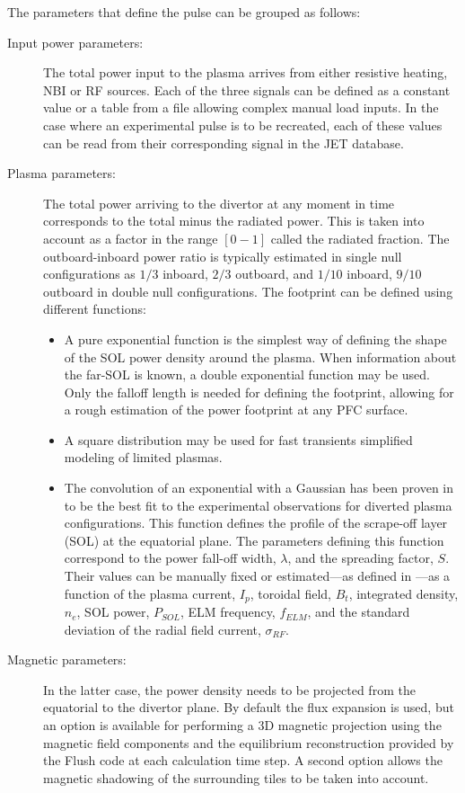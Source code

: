 The parameters that define the pulse can be grouped as follows:
\begin{description}
	\item [Input power parameters:] The total power input to the plasma arrives from either resistive heating, NBI or RF sources. Each of the three signals can be defined as a constant value or a table from a file allowing complex manual load inputs. In the case where an experimental pulse is to be recreated, each of these values can be read from their corresponding signal in the JET database.
	\item [Plasma parameters:] The total power arriving to the divertor at any moment in time corresponds to the total minus the radiated power. This is taken into account as a factor in the range $[0-1]$ called the radiated fraction. The outboard-inboard power ratio is typically estimated in single null configurations as $1/3$ inboard, $2/3$ outboard, and $1/10$ inboard, $9/10$ outboard in double null configurations. The footprint can be defined using different functions:
	\begin{itemize}
		\item A pure exponential function is the simplest way of defining the shape of the SOL power density around the plasma. When information about the far-SOL is known, a double exponential function may be used. Only the falloff length is needed for defining the footprint, allowing for a rough estimation of the power footprint at any PFC surface.
		\item A square distribution may be used for fast transients simplified modeling of limited plasmas. 
		\item The convolution of an exponential with a Gaussian has been proven in \cite{Eich2013} to be the best fit to the experimental observations for diverted plasma configurations. This function defines the profile of the scrape-off layer (SOL) at the equatorial plane. The parameters defining this function correspond to the power fall-off width, $\lambda$, and the spreading factor, $S$. Their values can be manually fixed or estimated---as defined in \cite{Riccardo2016}---as a function of the plasma current, $I_p$, toroidal field, $B_t$, integrated density, $n_e$, SOL power, $P_{SOL}$, ELM frequency, $f_{ELM}$, and the standard deviation of the radial field current, $\sigma_{RF}$.
	\end{itemize}
	
	\item[Magnetic parameters:] In the latter case, the power density needs to be projected from the equatorial to the divertor plane. By default the flux expansion is used, but an option is available for performing a 3D magnetic projection using the magnetic field components and the equilibrium reconstruction provided by the Flush code \cite{Pamella2015} at each calculation time step. A second option allows the magnetic shadowing of the surrounding tiles to be taken into account.
	

\end{description}
